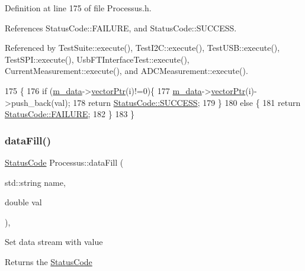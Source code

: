 Definition at line 175 of file Processus.\+h.



References Status\+Code\+::\+F\+A\+I\+L\+U\+RE, and Status\+Code\+::\+S\+U\+C\+C\+E\+SS.



Referenced by Test\+Suite\+::execute(), Test\+I2\+C\+::execute(), Test\+U\+S\+B\+::execute(), Test\+S\+P\+I\+::execute(), Usb\+F\+T\+Interface\+Test\+::execute(), Current\+Measurement\+::execute(), and A\+D\+C\+Measurement\+::execute().


\begin{DoxyCode}
175                                         \{
176     \textcolor{keywordflow}{if} (\hyperlink{classProcessus_a3da9a9de8af54e2f47807a3e09dfccff}{m\_data}->\hyperlink{classData_aa2153cb57f6f1a67b54eafe5582e0b6b}{vectorPtr}(i)!=0)\{
177       \hyperlink{classProcessus_a3da9a9de8af54e2f47807a3e09dfccff}{m\_data}->\hyperlink{classData_aa2153cb57f6f1a67b54eafe5582e0b6b}{vectorPtr}(i)->push\_back(val);
178       \textcolor{keywordflow}{return} \hyperlink{classStatusCode_a6f565cbeadc76d14c72f047e5e85eb4badd0da38d3ba0d922efd1f4619bc37ad8}{StatusCode::SUCCESS};
179     \}
180     \textcolor{keywordflow}{else} \{
181       \textcolor{keywordflow}{return} \hyperlink{classStatusCode_a6f565cbeadc76d14c72f047e5e85eb4ba3da73d4c469762eb9d3c960368252b26}{StatusCode::FAILURE};
182     \}
183   \}
\end{DoxyCode}
\mbox{\label{classProcessus_aa31ab71711f7af6a729441ff573f69c9}} 
\subsubsection{\texorpdfstring{data\+Fill()}{dataFill()}\hspace{0.1cm}{\footnotesize\ttfamily [2/2]}}
{\footnotesize\ttfamily \hyperlink{classStatusCode}{Status\+Code} Processus\+::data\+Fill (\begin{DoxyParamCaption}\item[{std\+::string}]{name,  }\item[{double}]{val }\end{DoxyParamCaption})\hspace{0.3cm}{\ttfamily [inline]}, {\ttfamily [inherited]}}

Set data stream with value \begin{DoxyReturn}{Returns}
the \hyperlink{classStatusCode}{Status\+Code} 
\end{DoxyReturn}


